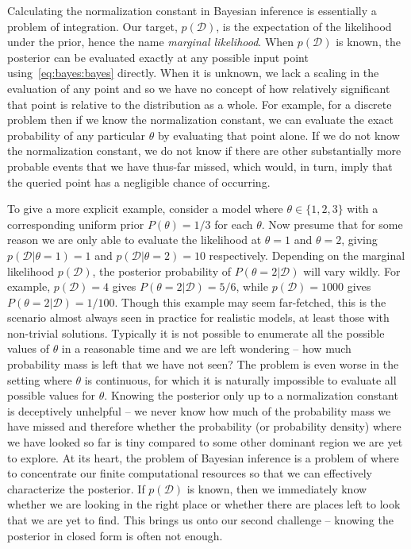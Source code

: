 Calculating the normalization constant in Bayesian inference is essentially a problem of
integration.  Our target, $p(\mathcal{D})$, is the expectation of the likelihood under the prior,
hence the name \emph{marginal likelihood}.  When $p(\mathcal{D})$ is known, the posterior can be evaluated
exactly at any possible input point using~\eqref{eq:bayes:bayes} directly.  When it is unknown, we lack
a scaling in the evaluation of any point and so we have no concept of how relatively 
significant that point is relative to the distribution as a whole.  For example, for a discrete
problem then if we know the normalization constant, we can evaluate the exact probability of any
particular $\theta$ by evaluating that point alone.  If we do not know the normalization constant, we do
not know if there are other substantially more probable events that we have thus-far missed, which
would, in turn, imply that the queried point has a negligible chance of occurring.
 
To give a more explicit example, consider a model where $\theta \in \{1,2,3\}$ with a corresponding uniform prior $P(\theta) = 1/3$
for each $\theta$.  Now presume that for some reason we are only able to evaluate the likelihood at 
$\theta=1$ and $\theta=2$, giving $p(\mathcal{D}|\theta=1)=1$ and $p(\mathcal{D}|\theta=2)=10$ respectively.  Depending on the marginal
likelihood $p(\mathcal{D})$, the posterior probability of $P(\theta=2 | \mathcal{D})$ will vary wildly.  For example,
$p(\mathcal{D})=4$ gives $P(\theta=2 | \mathcal{D}) = 5/6$, while $p(\mathcal{D})=1000$ gives $P(\theta=2 | \mathcal{D}) = 1/100$.  Though this
example may seem far-fetched, this is the scenario almost always seen in practice for realistic
models, at least those with non-trivial solutions.   Typically it is not
possible to enumerate all the possible values of $\theta$ in a reasonable time and we are left 
wondering -- how much probability mass is left that we have not seen?  The problem is even worse 
in the setting where $\theta$ is continuous, for
which it is naturally impossible to evaluate all possible values for $\theta$.  
Knowing the posterior only up to a normalization constant is deceptively unhelpful -- we never
know how much of the probability mass we have missed and therefore whether the probability (or
probability density) where we have looked so far is tiny compared to some other dominant region
we are yet to explore.  At its heart, the problem of Bayesian inference is a problem
of where to concentrate our finite computational resources so that we can effectively characterize
the posterior.  If $p(\mathcal{D})$ is known, then we immediately know whether we are looking in the right
place or whether there are places left to look that we are yet to find.  This brings us onto
our second challenge -- knowing the posterior in closed form is often not enough.

